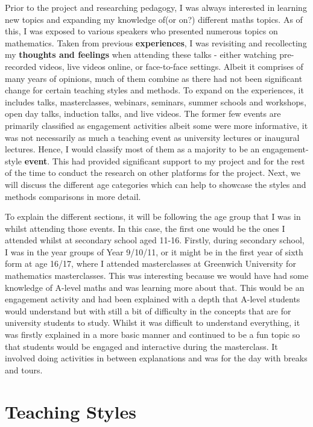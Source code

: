 \documentclass[12pt, a4paper,oneside]{book}
\numberwithin{equation}{section}
\begin{document}
Prior to the project and researching pedagogy, I was always interested in learning new topics and expanding my knowledge of(or on?) different maths topics. As of this, I was exposed to various speakers who presented numerous topics on mathematics. Taken from previous {\color{red}\textbf{experiences}}, I was revisiting and recollecting my {\color{red}\textbf{thoughts and feelings}} when attending these talks - either watching pre-recorded videos, live videos online, or face-to-face settings. Albeit it comprises of many years of opinions, much of them combine as there had not been significant change for certain teaching styles and methods. To expand on the experiences, it includes talks, masterclasses, webinars, seminars, summer schools and workshops, open day talks, induction talks, and live videos. The former few events are primarily classified as engagement activities albeit some were more informative, it was not necessarily as much a teaching event as university lectures or inaugural lectures. Hence, I would classify most of them as a majority to be an engagement-style {\color{red}\textbf{event}}. This had provided significant support to my project and for the rest of the time to conduct the research on other platforms for the project. Next, we will discuss the different age categories which can help to showcase the styles and methods comparisons in more detail.

To explain the different sections, it will be following the age group that I was in whilst attending those events. In this case, the first one would be the ones I attended whilst at secondary school aged 11-16. Firstly, during secondary school, I was in the year groups of Year 9/10/11, or it might be in the first year of sixth form at age 16/17, where I attended masterclasses at Greenwich University for mathematics masterclasses. This was interesting because we would have had some knowledge of A-level maths and was learning more about that. This would be an engagement activity and had been explained with a depth that A-level students would understand but with still a bit of difficulty in the concepts that are for university students to study. Whilst it was difficult to understand everything, it was firstly explained in a more basic manner and continued to be a fun topic so that students would be engaged and interactive during the masterclass. It involved doing activities in between explanations and was for the day with breaks and tours.

\section{Teaching Styles}\label{sec:2.1}
\end{document}
